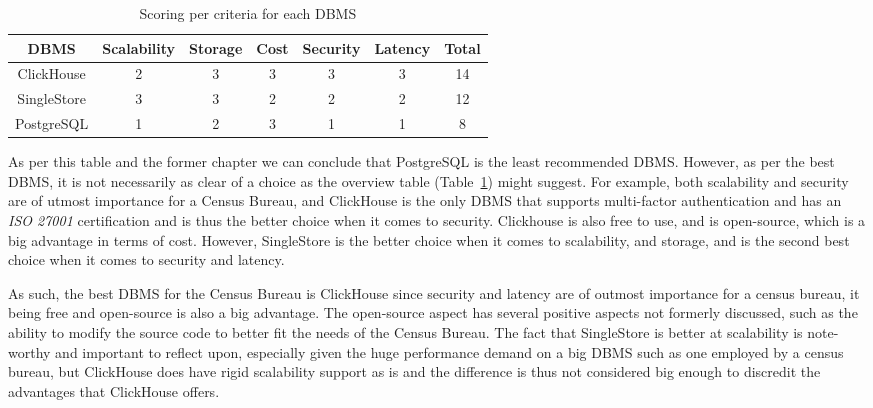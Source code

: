 \begin{table}[h]
    \centering
    \begin{tabular}{|c|c|c|c|c|c|c|}
    \hline
    \textbf{DBMS} & \textbf{Scalability} & \textbf{Storage} & \textbf{Cost} & \textbf{Security} & \textbf{Latency} & \textbf{Total} \\ \hline
    ClickHouse & 2 & 3 & 3 & 3 & 3 & 14 \\ \hline
    SingleStore & 3 & 3 & 2 & 2 & 2 & 12 \\ \hline
    PostgreSQL & 1 & 2 & 3 & 1 & 1 & 8 \\ \hline
    \end{tabular}
    \caption{Scoring per criteria for each DBMS}
    \label{tab:my-table}
\end{table}

As per this table and the former chapter we can conclude that PostgreSQL is the least recommended DBMS. However, as per the best DBMS, it is not necessarily as clear of a choice as the overview table (Table~\ref{tab:my-table}) might suggest.
For example, both scalability and security are of utmost importance for a Census Bureau, and ClickHouse is the only DBMS that supports multi-factor authentication and has an \textit{ISO 27001} certification and is thus the better choice when it comes to security. 
Clickhouse is also free to use, and is open-source, which is a big advantage in terms of cost.
However, SingleStore is the better choice when it comes to scalability, and storage, and is the second best choice when it comes to security and latency.

As such, the best DBMS for the Census Bureau is ClickHouse since security and latency are of outmost importance for a census bureau, it being free and open-source is also a big advantage. The open-source aspect has several positive aspects not formerly discussed, such as the ability to modify the source code to better fit the needs of the Census Bureau.
The fact that SingleStore is better at scalability is note-worthy and important to reflect upon, especially given the huge performance demand on a big DBMS such as one employed by a census bureau, but ClickHouse does have rigid scalability support as is and the difference is thus not considered big enough to discredit the advantages that ClickHouse offers.